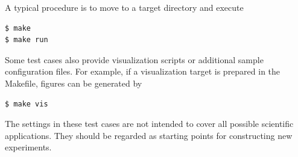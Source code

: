 A typical procedure is to move to a target directory and execute

\begin{verbatim}
$ make
$ make run
\end{verbatim}

Some test cases also provide visualization scripts or additional sample
configuration files. For example, if a visualization target is prepared in
the Makefile, figures can be generated by

\begin{verbatim}
$ make vis
\end{verbatim}

The settings in these test cases are not intended to cover all possible
scientific applications. They should be regarded as starting points for
constructing new experiments.